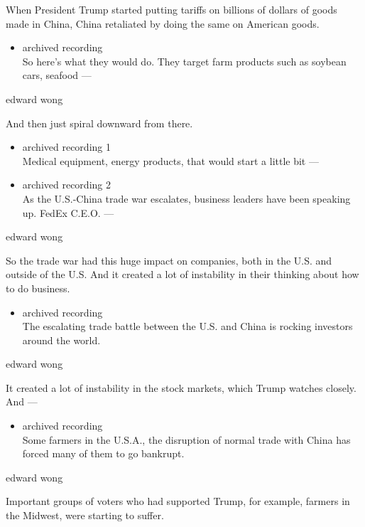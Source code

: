 When President Trump started putting tariffs on billions of dollars of
goods made in China, China retaliated by doing the same on American
goods.

\begin{itemize}
\tightlist
\item
  archived recording\\
  So here's what they would do. They target farm products such as
  soybean cars, seafood ---
\end{itemize}

edward wong

And then just spiral downward from there.

\begin{itemize}
\item
  archived recording 1\\
  Medical equipment, energy products, that would start a little bit ---
\item
  archived recording 2\\
  As the U.S.-China trade war escalates, business leaders have been
  speaking up. FedEx C.E.O. ---
\end{itemize}

edward wong

So the trade war had this huge impact on companies, both in the U.S. and
outside of the U.S. And it created a lot of instability in their
thinking about how to do business.

\begin{itemize}
\tightlist
\item
  archived recording\\
  The escalating trade battle between the U.S. and China is rocking
  investors around the world.
\end{itemize}

edward wong

It created a lot of instability in the stock markets, which Trump
watches closely. And ---

\begin{itemize}
\tightlist
\item
  archived recording\\
  Some farmers in the U.S.A., the disruption of normal trade with China
  has forced many of them to go bankrupt.
\end{itemize}

edward wong

Important groups of voters who had supported Trump, for example, farmers
in the Midwest, were starting to suffer.

